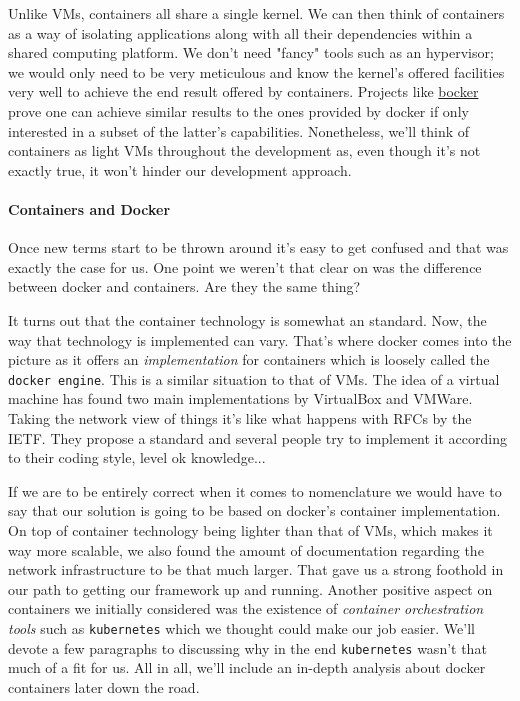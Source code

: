                 Unlike VMs, containers all share a single kernel. We can then think of containers as a way of isolating applications along with all their dependencies within a shared computing platform. We don't need "fancy" tools such as an hypervisor; we would only need to be very meticulous and know the kernel's offered facilities very well to achieve the end result offered by containers. Projects like \href{https://github.com/p8952/bocker}{bocker} prove one can achieve similar results to the ones provided by docker if only interested in a subset of the latter's capabilities. Nonetheless, we'll think of containers as light VMs throughout the development as, even though it's not exactly true, it won't hinder our development approach.\\

                \paragraph{Containers and Docker}
                    Once new terms start to be thrown around it's easy to get confused and that was exactly the case for us. One point we weren't that clear on was the difference between docker and containers. Are they the same thing?

                    It turns out that the container technology is somewhat an standard. Now, the way that technology is implemented can vary. That's where docker comes into the picture as it offers an \textit{implementation} for containers which is loosely called the \texttt{docker engine}. This is a similar situation to that of VMs. The idea of a virtual machine has found two main implementations by VirtualBox and VMWare. Taking the network view of things it's like what happens with RFCs by the IETF. They propose a standard and several people try to implement it according to their coding style, level ok knowledge...

                    If we are to be entirely correct when it comes to nomenclature we would have to say that our solution is going to be based on docker's container implementation.\\

                On top of container technology being lighter than that of VMs, which makes it way more scalable, we also found the amount of documentation regarding the network infrastructure to be that much larger. That gave us a strong foothold in our path to getting our framework up and running. Another positive aspect on containers we initially considered was the existence of \textit{container orchestration tools} such as \texttt{kubernetes} which we thought could make our job easier. We'll devote a few paragraphs to discussing why in the end \texttt{kubernetes} wasn't that much of a fit for us. All in all, we'll include an in-depth analysis about docker containers later down the road.


